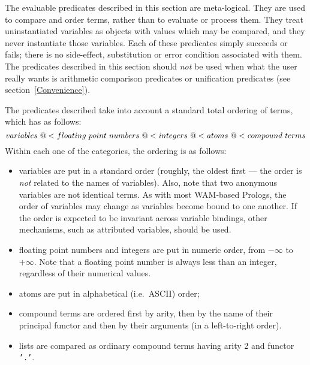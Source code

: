 The evaluable predicates described in this section are meta-logical.
They are used to compare and order terms, rather than to evaluate or 
process them.  They treat uninstantiated variables as objects with values
which may be compared, and they never instantiate those variables.
Each of these predicates simply succeeds or fails; there is no 
side-effect, substitution or error condition associated with them.
The predicates described in this section should {\em not} be used when 
what the user really wants is arithmetic comparison predicates
or unification predicates (see section~\ref{Convenience}).

The predicates described take into account a standard total ordering 
of terms, which has as follows:
	\[		variables 
	   \ {\tt @<} \ floating \ point \ numbers
	   \ {\tt @<} \ integers 
	   \ {\tt @<} \ atoms 
	   \ {\tt @<} \ compound \ terms \]
Within each one of the categories, the ordering is as follows:
\begin{itemize}
\item	variables are put in a standard order (roughly, the oldest first
	--- the order is {\em not\/} related to the names of
	variables).  Also, note that two anonymous variables are not
	identical terms.  As with most WAM-based Prologs, the order of
	variables may change as variables become bound to one another.
	If the order is expected to be invariant across variable
	bindings, other mechanisms, such as attributed variables,
	should be used.
\item	floating point numbers and integers are put in numeric order, 
	from $-\infty$ to $+\infty$.  Note that a floating point number is
	always less than an integer, regardless of their numerical values.
\item	atoms are put in alphabetical (i.e.\ ASCII) order;
\item	compound terms are ordered first by arity, then by the name of their
	principal functor and then by their arguments (in a left-to-right 
	order).
\item	lists are compared as ordinary compound terms having arity 2 and 
	functor {\tt '.'}.
\end{itemize}

